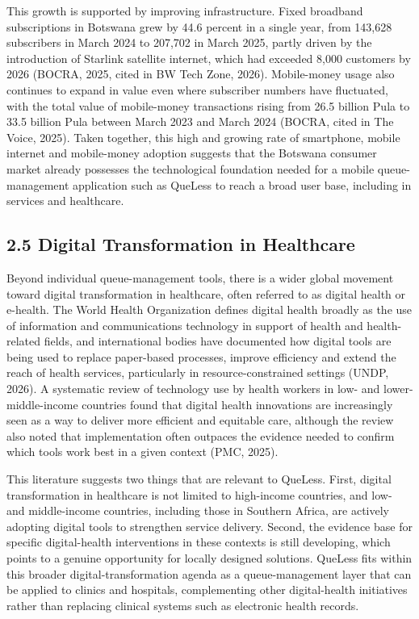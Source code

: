 \documentclass[
]{article}
\begin{document}
This growth is supported by improving infrastructure. Fixed broadband
subscriptions in Botswana grew by 44.6 percent in a single year, from
143,628 subscribers in March 2024 to 207,702 in March 2025, partly
driven by the introduction of Starlink satellite internet, which had
exceeded 8,000 customers by 2026 (BOCRA, 2025, cited in BW Tech Zone,
2026). Mobile-money usage also continues to expand in value even where
subscriber numbers have fluctuated, with the total value of mobile-money
transactions rising from 26.5 billion Pula to 33.5 billion Pula between
March 2023 and March 2024 (BOCRA, cited in The Voice, 2025). Taken
together, this high and growing rate of smartphone, mobile internet and
mobile-money adoption suggests that the Botswana consumer market already
possesses the technological foundation needed for a mobile
queue-management application such as QueLess to reach a broad user base,
including in services and healthcare.

\subsection{2.5 Digital Transformation in
Healthcare}\label{digital-transformation-in-healthcare}

Beyond individual queue-management tools, there is a wider global
movement toward digital transformation in healthcare, often referred to
as digital health or e-health. The World Health Organization defines
digital health broadly as the use of information and communications
technology in support of health and health-related fields, and
international bodies have documented how digital tools are being used to
replace paper-based processes, improve efficiency and extend the reach
of health services, particularly in resource-constrained settings (UNDP,
2026). A systematic review of technology use by health workers in low-
and lower-middle-income countries found that digital health innovations
are increasingly seen as a way to deliver more efficient and equitable
care, although the review also noted that implementation often outpaces
the evidence needed to confirm which tools work best in a given context
(PMC, 2025).

This literature suggests two things that are relevant to QueLess. First,
digital transformation in healthcare is not limited to high-income
countries, and low- and middle-income countries, including those in
Southern Africa, are actively adopting digital tools to strengthen
service delivery. Second, the evidence base for specific digital-health
interventions in these contexts is still developing, which points to a
genuine opportunity for locally designed solutions. QueLess fits within
this broader digital-transformation agenda as a queue-management layer
that can be applied to clinics and hospitals, complementing other
digital-health initiatives rather than replacing clinical systems such
as electronic health records.
\end{document}
